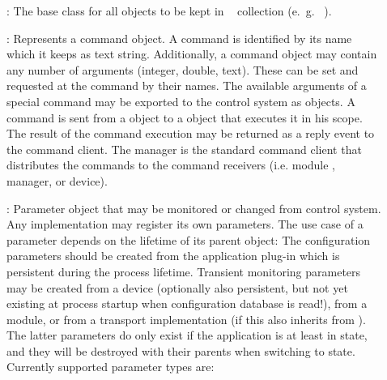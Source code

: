 \begin{description}
\item[] : The base class for all objects to be kept in 
   \dabc~ collection (e.~g.~ ).
\item[] : Represents a command object. A command 
   is identified by its name which it keeps as text string. Additionally, 
   a command object may contain any number of arguments (integer, double, text). 
   These can be set and requested at the command by their names. 
   The available arguments of a special command may be exported to the control 
   system as  objects. A command is sent from a 
    object to a  object
    that executes it in his scope. 
   The result of the command execution may be returned as a reply event to 
   the command client. The manager is the standard command client 
   that distributes the commands to the command receivers 
   (i.e. module , manager, or device). 
\item[] : Parameter object that may be monitored or 
   changed from control system. Any  implementation 
   may register its own parameters. The use case of a parameter 
   depends on the lifetime of its parent object: The configuration 
   parameters should be created from the application plug-in which 
   is persistent during the process lifetime. Transient monitoring parameters 
   may be created from a device (optionally also persistent, but not 
   yet existing at process startup when configuration database is read!), 
   from a module, or from a transport implementation (if this 
   also inherits from ). The latter parameters 
   do only exist if the application is at least in  state, and 
   they will be destroyed with their parents when switching to  state. 
   Currently supported parameter types are:
\end{description}

